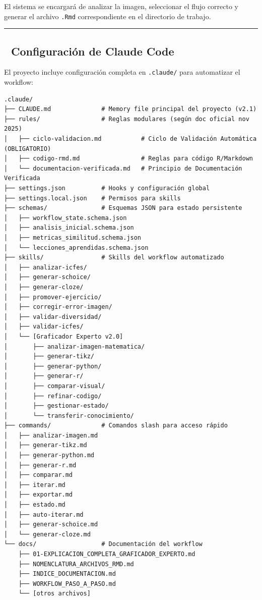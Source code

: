 \documentclass[
]{article}
\begin{document}
El sistema se encargará de analizar la imagen, seleccionar el flujo
correcto y generar el archivo \texttt{.Rmd} correspondiente en el
directorio de trabajo.

\begin{center}\rule{0.5\linewidth}{0.5pt}\end{center}

\subsection{\texorpdfstring{🤖 \textbf{Configuración de Claude
Code}}{🤖 Configuración de Claude Code}}\label{configuraciuxf3n-de-claude-code}

El proyecto incluye configuración completa en \texttt{.claude/} para
automatizar el workflow:

\begin{verbatim}
.claude/
├── CLAUDE.md              # Memory file principal del proyecto (v2.1)
├── rules/                 # Reglas modulares (según doc oficial nov 2025)
│   ├── ciclo-validacion.md           # Ciclo de Validación Automática (OBLIGATORIO)
│   ├── codigo-rmd.md                 # Reglas para código R/Markdown
│   └── documentacion-verificada.md   # Principio de Documentación Verificada
├── settings.json          # Hooks y configuración global
├── settings.local.json    # Permisos para skills
├── schemas/               # Esquemas JSON para estado persistente
│   ├── workflow_state.schema.json
│   ├── analisis_inicial.schema.json
│   ├── metricas_similitud.schema.json
│   └── lecciones_aprendidas.schema.json
├── skills/                # Skills del workflow automatizado
│   ├── analizar-icfes/
│   ├── generar-schoice/
│   ├── generar-cloze/
│   ├── promover-ejercicio/
│   ├── corregir-error-imagen/
│   ├── validar-diversidad/
│   ├── validar-icfes/
│   └── [Graficador Experto v2.0]
│       ├── analizar-imagen-matematica/
│       ├── generar-tikz/
│       ├── generar-python/
│       ├── generar-r/
│       ├── comparar-visual/
│       ├── refinar-codigo/
│       ├── gestionar-estado/
│       └── transferir-conocimiento/
├── commands/              # Comandos slash para acceso rápido
│   ├── analizar-imagen.md
│   ├── generar-tikz.md
│   ├── generar-python.md
│   ├── generar-r.md
│   ├── comparar.md
│   ├── iterar.md
│   ├── exportar.md
│   ├── estado.md
│   ├── auto-iterar.md
│   ├── generar-schoice.md
│   └── generar-cloze.md
└── docs/                  # Documentación del workflow
    ├── 01-EXPLICACION_COMPLETA_GRAFICADOR_EXPERTO.md
    ├── NOMENCLATURA_ARCHIVOS_RMD.md
    ├── INDICE_DOCUMENTACION.md
    ├── WORKFLOW_PASO_A_PASO.md
    └── [otros archivos]
\end{verbatim}
\end{document}
